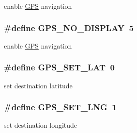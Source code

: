 enable \hyperlink{classGPS}{G\-P\-S} navigation \hypertarget{group__gps__commands_ga3de45ac0f8b80c8044b533d47cf08e99}{
\subsubsection[{G\-P\-S\-\_\-\-N\-O\-\_\-\-D\-I\-S\-P\-L\-A\-Y}]{\setlength{\rightskip}{0pt plus 5cm}\#define G\-P\-S\-\_\-\-N\-O\-\_\-\-D\-I\-S\-P\-L\-A\-Y~5}}\label{group__gps__commands_ga3de45ac0f8b80c8044b533d47cf08e99}
enable \hyperlink{classGPS}{G\-P\-S} navigation \hypertarget{group__gps__commands_gaac31d4fc4681381604fdbf78b5aa7599}{
\subsubsection[{G\-P\-S\-\_\-\-S\-E\-T\-\_\-\-L\-A\-T}]{\setlength{\rightskip}{0pt plus 5cm}\#define G\-P\-S\-\_\-\-S\-E\-T\-\_\-\-L\-A\-T~0}}\label{group__gps__commands_gaac31d4fc4681381604fdbf78b5aa7599}
set destination latitude \hypertarget{group__gps__commands_gafe7ed49e1848a16fd15d1643b4c4c36b}{
\subsubsection[{G\-P\-S\-\_\-\-S\-E\-T\-\_\-\-L\-N\-G}]{\setlength{\rightskip}{0pt plus 5cm}\#define G\-P\-S\-\_\-\-S\-E\-T\-\_\-\-L\-N\-G~1}}\label{group__gps__commands_gafe7ed49e1848a16fd15d1643b4c4c36b}
set destination longitude 